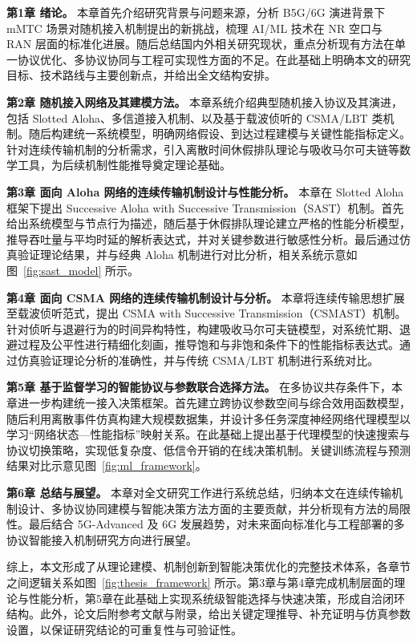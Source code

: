 \textbf{第1章 绪论。}
本章首先介绍研究背景与问题来源，分析 B5G/6G 演进背景下 mMTC 场景对随机接入机制提出的新挑战，梳理 AI/ML 技术在 NR 空口与 RAN 层面的标准化进展。随后总结国内外相关研究现状，重点分析现有方法在单一协议优化、多协议协同与工程可实现性方面的不足。在此基础上明确本文的研究目标、技术路线与主要创新点，并给出全文结构安排。

\textbf{第2章 随机接入网络及其建模方法。}
本章系统介绍典型随机接入协议及其演进，包括 Slotted Aloha、多信道接入机制、以及基于载波侦听的 CSMA/LBT 类机制。随后构建统一系统模型，明确网络假设、到达过程建模与关键性能指标定义。针对连续传输机制的分析需求，引入离散时间休假排队理论与吸收马尔可夫链等数学工具，为后续机制性能推导奠定理论基础。

\textbf{第3章 面向 Aloha 网络的连续传输机制设计与性能分析。}
本章在 Slotted Aloha 框架下提出 Successive Aloha with Successive Transmission（SAST）机制。首先给出系统模型与节点行为描述，随后基于休假排队理论建立严格的性能分析模型，推导吞吐量与平均时延的解析表达式，并对关键参数进行敏感性分析。最后通过仿真验证理论结果，并与经典 Aloha 机制进行对比分析，相关系统示意如图~\ref{fig:sast_model} 所示。

\textbf{第4章 面向 CSMA 网络的连续传输机制设计与分析。}
本章将连续传输思想扩展至载波侦听范式，提出 CSMA with Successive Transmission（CSMAST）机制。针对侦听与退避行为的时间异构特性，构建吸收马尔可夫链模型，对系统忙期、退避过程及公平性进行精细化刻画，推导饱和与非饱和条件下的性能指标表达式。通过仿真验证理论分析的准确性，并与传统 CSMA/LBT 机制进行系统对比。

\textbf{第5章 基于监督学习的智能协议与参数联合选择方法。}
在多协议共存条件下，本章进一步构建统一接入决策框架。首先建立跨协议参数空间与综合效用函数模型，随后利用离散事件仿真构建大规模数据集，并设计多任务深度神经网络代理模型以学习“网络状态—性能指标”映射关系。在此基础上提出基于代理模型的快速搜索与协议切换策略，实现低复杂度、低信令开销的在线决策机制。关键训练流程与预测结果对比示意见图~\ref{fig:ml_framework}。

\textbf{第6章 总结与展望。}
本章对全文研究工作进行系统总结，归纳本文在连续传输机制设计、多协议协同建模与智能决策方法方面的主要贡献，并分析现有方法的局限性。最后结合 5G-Advanced 及 6G 发展趋势，对未来面向标准化与工程部署的多协议智能接入机制研究方向进行展望。

综上，本文形成了从理论建模、机制创新到智能决策优化的完整技术体系，各章节之间逻辑关系如图~\ref{fig:thesis_framework} 所示。第3章与第4章完成机制层面的理论与性能分析，第5章在此基础上实现系统级智能选择与快速决策，形成自洽闭环结构。此外，论文后附参考文献与附录，给出关键定理推导、补充证明与仿真参数设置，以保证研究结论的可重复性与可验证性。



